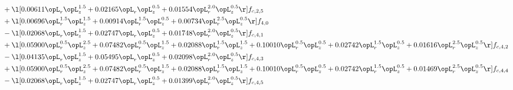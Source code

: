 \begin{alignat}{2}
& + \l[  0.00611 \opL_r \opL_z^{1.5} +  0.02165 \opL_r \opL_z^{0.5} +  0.01554 \opL_r^{2.0} \opL_z^{0.5}  \r] f_{c,2,5} \nonumber \\ 
& + \l[  0.00696 \opL_r^{1.5} \opL_z^{1.5} +  0.00914 \opL_r^{1.5} \opL_z^{0.5} +  0.00734 \opL_r^{2.5} \opL_z^{0.5}  \r] f_{4,0} \nonumber \\ 
& - \l[  0.02068 \opL_r \opL_z^{1.5} +  0.02747 \opL_r \opL_z^{0.5} +  0.01748 \opL_r^{2.0} \opL_z^{0.5}  \r] f_{c,4,1} \nonumber \\ 
& + \l[  0.05900 \opL_r^{0.5} \opL_z^{2.5} +  0.07482 \opL_r^{0.5} \opL_z^{1.5} +  0.02088 \opL_r^{1.5} \opL_z^{1.5} +  0.10010 \opL_r^{0.5} \opL_z^{0.5} +  0.02742 \opL_r^{1.5} \opL_z^{0.5} +  0.01616 \opL_r^{2.5} \opL_z^{0.5}  \r] f_{c,4,2} \nonumber \\ 
& - \l[  0.04135 \opL_r \opL_z^{1.5} +  0.05495 \opL_r \opL_z^{0.5} +  0.02098 \opL_r^{2.0} \opL_z^{0.5}  \r] f_{c,4,3} \nonumber \\ 
& + \l[  0.05900 \opL_r^{0.5} \opL_z^{2.5} +  0.07482 \opL_r^{0.5} \opL_z^{1.5} +  0.02088 \opL_r^{1.5} \opL_z^{1.5} +  0.10010 \opL_r^{0.5} \opL_z^{0.5} +  0.02742 \opL_r^{1.5} \opL_z^{0.5} +  0.01469 \opL_r^{2.5} \opL_z^{0.5}  \r] f_{c,4,4} \nonumber \\ 
& - \l[  0.02068 \opL_r \opL_z^{1.5} +  0.02747 \opL_r \opL_z^{0.5} +  0.01399 \opL_r^{2.0} \opL_z^{0.5}  \r] f_{c,4,5} \nonumber \\ 
\end{alignat} 


